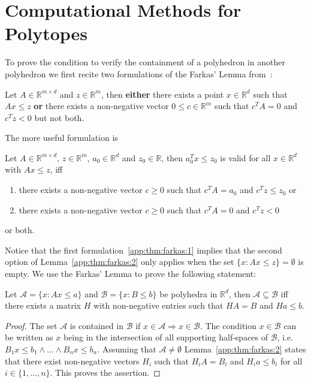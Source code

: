 
\chapter{Computational Methods for Polytopes}\label{app:computational:methods:chapter}
%
%
%
%
To prove the condition to verify the containment of a polyhedron in another polyhedron we first recite two formulations of the Farkas' Lemma from~\cite{Ziegler:1995}:
%
\begin{thm}\label{app:thm:farkas:1}
Let $A\in\mathbb R^{m\times d}$ and $z\in\mathbb R^m$, then \textbf{either} there exists a point $x\in\mathbb R^d$ such that $Ax\leq z$ \textbf{or} there exists a non-negative vector $0\leq c\in\mathbb R^m$ such that $c^T A = 0$ and $c^T z<0$ but not both.
\end{thm}
%
\noindent The more useful formulation is
%
\begin{thm}\label{app:thm:farkas:2}
Let $A\in\mathbb R^{m\times d}$, $z\in\mathbb R^m$, $a_0\in\mathbb R^d$ and $z_0\in\mathbb R$, then $a_0^Tx\leq z_0$ is valid for all $x\in\mathbb R^d$ with $Ax\leq z$, iff
\begin{enumerate}
\item there exists a non-negative vector $c\geq0$ such that $c^TA = a_0$ and $c^Tz\leq z_0$ or
\item there exists a non-negative vector $c\geq0$ such that $c^TA = 0$ and $c^Tz<0$
\end{enumerate}
or both.
\end{thm}
%
\noindent Notice that the first formulation~\ref{app:thm:farkas:1} implies that the second option of Lemma~\ref{app:thm:farkas:2} only applies when the set $\{x:Ax\leq z\} = \emptyset$ is empty.
%
We use the Farkas' Lemma to prove the following statement:
%
\begin{thm}\label{app:thm:polytope:inclusion}
Let $\mathcal A = \{x:Ax\leq a\}$ and $\mathcal B = \{x:B\leq b\}$ be polyhedra in $\mathbb R^d$, then $\mathcal A\subseteq \mathcal B$ iff there exists a matrix $H$ with non-negative entries such that $HA = B$ and $Ha\leq b$.
\end{thm}
%
\begin{proof}
The set $\mathcal A$ is contained in $\mathcal B$ if $x\in\mathcal A\Rightarrow x\in\mathcal B$.
%
The condition $x\in\mathcal B$ can be written as $x$ being in the intersection of all supporting half-spaces of $\mathcal B$, i.e. $B_1x\leq b_1\wedge\dots\wedge B_n x\leq b_n$.
%
Assuming that $\mathcal A\neq\emptyset$ Lemma~\ref{app:thm:farkas:2} states that there exist non-negative vectors $H_i$ such that $H_iA=B_i$ and $H_ia\leq b_i$ for all $i\in\{1,\dots,n\}$.
%
This proves the assertion.
\end{proof}
